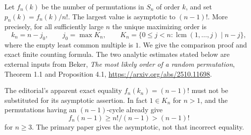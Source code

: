 Let $f_n(k)$ be the number of permutations in $S_n$ of order $k$, and set $p_n(k)=f_n(k)/n!$. The largest value is asymptotic to $(n-1)!$. More precisely, for all sufficiently large $n$ the unique maximizing order is
\[
 k_n=n-j_0,\qquad j_0=\max K_n,\qquad
 K_n=\{0\le j<n:\operatorname{lcm}(1,\ldots,j)\mid n-j\},\tag{1}
\]
where the empty least common multiple is $1$. We give the comparison proof and exact finite counting formula. The two analytic estimates stated below are external inputs from Beker, \emph{The most likely order of a random permutation}, Theorem 1.1 and Proposition 4.1, \url{https://arxiv.org/abs/2510.11698}.

The editorial's apparent exact equality $f_n(k_n)=(n-1)!$ must not be substituted for its asymptotic assertion. In fact $1\in K_n$ for $n>1$, and the permutations having an $(n-1)$-cycle already give
\[
 f_n(n-1)\ge n!/(n-1)>(n-1)!
\]
for $n\ge3$. The primary paper gives the asymptotic, not that incorrect equality.
